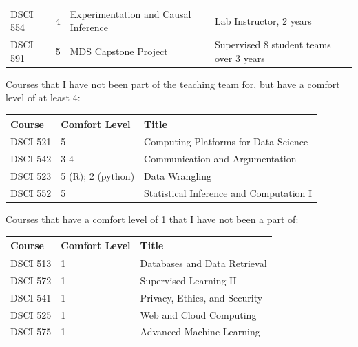 \documentclass[]{article}
\begin{document}
\begin{longtable}[]{@{}llll@{}}
\begin{minipage}[t]{0.21\columnwidth}
DSCI 554\strut
\end{minipage} & \begin{minipage}[t]{0.29\columnwidth}\raggedright
4\strut
\end{minipage} & \begin{minipage}[t]{0.13\columnwidth}\raggedright
Experimentation and Causal Inference\strut
\end{minipage} & \begin{minipage}[t]{0.25\columnwidth}\raggedright
Lab Instructor, 2 years\strut
\end{minipage}\tabularnewline
\begin{minipage}[t]{0.21\columnwidth}\raggedright
DSCI 591\strut
\end{minipage} & \begin{minipage}[t]{0.29\columnwidth}\raggedright
5\strut
\end{minipage} & \begin{minipage}[t]{0.13\columnwidth}\raggedright
MDS Capstone Project\strut
\end{minipage} & \begin{minipage}[t]{0.25\columnwidth}\raggedright
Supervised 8 student teams over 3 years\strut
\end{minipage}\tabularnewline
\bottomrule
\end{longtable}

Courses that I have not been part of the teaching team for, but have a comfort level of at least 4:

\begin{longtable}[]{@{}lll@{}}
\toprule
Course & Comfort Level & Title\tabularnewline
\midrule
\endhead
DSCI 521 & 5 & Computing Platforms for Data Science\tabularnewline
DSCI 542 & 3-4 & Communication and Argumentation\tabularnewline
DSCI 523 & 5 (R); 2 (python) & Data Wrangling\tabularnewline
DSCI 552 & 5 & Statistical Inference and Computation I\tabularnewline
\bottomrule
\end{longtable}

Courses that have a comfort level of 1 that I have not been a part of:

\begin{longtable}[]{@{}lll@{}}
\toprule
Course & Comfort Level & Title\tabularnewline
\midrule
\endhead
DSCI 513 & 1 & Databases and Data Retrieval\tabularnewline
DSCI 572 & 1 & Supervised Learning II\tabularnewline
DSCI 541 & 1 & Privacy, Ethics, and Security\tabularnewline
DSCI 525 & 1 & Web and Cloud Computing\tabularnewline
DSCI 575 & 1 & Advanced Machine Learning\tabularnewline
\bottomrule
\end{longtable}
\end{document}
